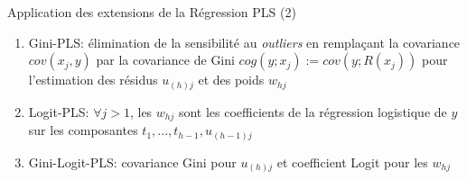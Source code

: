 \begin{frame}{Application des extensions de la Régression PLS (2)}

\begin{enumerate}
\setlength\itemsep{1.5em}

\item Gini-PLS: 
élimination de la sensibilité au \textit{outliers} en remplaçant la covariance $cov(x_j, y)$ par la covariance de Gini $cog(y; x_j) := cov(y; R(x_j))$ pour l'estimation des résidus $u_{(h)j}$ et des poids $w_{hj}$ \cite{mussard2018ginipls}

\item Logit-PLS:  $\forall j > 1$, les $w_{hj} $ sont les coefficients de la régression logistique de $y$ sur les composantes $t_1, ..., t_{h-1}, u_{(h-1)j}$ \cite{tenenhaus2005logitpls}

\item Gini-Logit-PLS: covariance Gini pour $u_{(h)j}$ et coefficient Logit pour les $w_{hj}$
\end{enumerate}
\end{frame}


